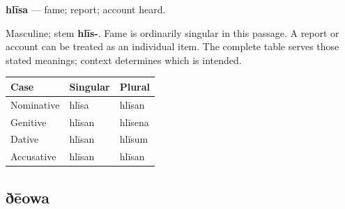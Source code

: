 \par\begin{minipage}{\linewidth}\raggedright
\textbf{hlīsa} — fame; report; account heard.

Masculine; stem \textbf{hlīs-}. Fame is ordinarily singular in this passage. A report or account can be treated as an individual item. The complete table serves those stated meanings; context determines which is intended.

\par\begingroup
\fontsize{10.5}{13.2}\selectfont
\setlength{\LTleft}{0pt}\setlength{\LTright}{\fill}
\noindent
\begin{tabular}{@{}>{\raggedright\arraybackslash}p{39.46mm}>{\raggedright\arraybackslash}p{39.46mm}>{\raggedright\arraybackslash}p{39.46mm}@{}}
\toprule
\textbf{Case} & \textbf{Singular} & \textbf{Plural} \\
\midrule
Nominative & hlīsa & hlīsan \\
Genitive & hlīsan & hlīsena \\
Dative & hlīsan & hlīsum \\
Accusative & hlīsan & hlīsan \\
\bottomrule
\end{tabular}
\par\endgroup

\end{minipage}\par
{}
\subsection*{ðēowa}

